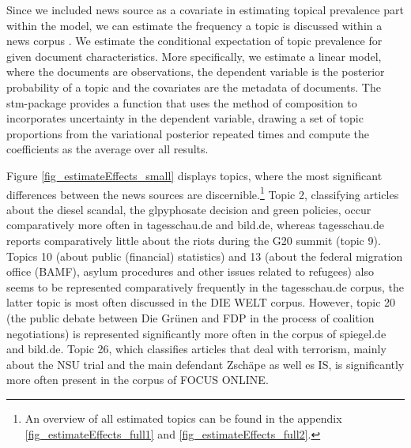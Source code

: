 \documentclass[12pt,a4paper,notitlepage]{article}
\begin{document}

Since we included news source as a covariate in estimating topical prevalence part within the model, we can estimate the frequency a topic is discussed within a news corpus \citep{roberts_model_2016}. We estimate the conditional expectation of topic prevalence for given document characteristics. More specifically, we estimate a linear model, where the documents are observations, the dependent variable is the posterior probability of a topic and the covariates are the metadata of documents. The stm-package provides a function that uses the method of composition to incorporates uncertainty in the dependent variable, drawing a set of topic proportions from the variational posterior repeated times and compute the coefficients as the average over all results. 

Figure \ref{fig_estimateEffects_small} displays topics, where the most significant differences between the news sources are discernible.\footnote{An overview of all estimated topics can be found in the appendix \ref{fig_estimateEffects_full1} and \ref{fig_estimateEffects_full2}.} Topic 2, classifying articles about the diesel scandal, the glpyphosate decision and green policies, occur comparatively more often in tagesschau.de and bild.de, whereas tagesschau.de reports comparatively little about the riots during the G20 summit (topic 9). Topics 10 (about public (financial) statistics) and 13 (about the federal migration office (BAMF), asylum procedures and other issues related to refugees) also seems to be represented comparatively frequently in the tagesschau.de corpus, the latter topic is most often discussed in the DIE WELT corpus. However, topic 20 (the public debate between Die Grünen and FDP in the process of coalition negotiations) is represented significantly more often in the corpus of spiegel.de and bild.de. Topic 26, which classifies articles that deal with terrorism, mainly about the NSU trial and the main defendant Zschäpe as well es IS, is significantly more often present in the corpus of FOCUS ONLINE.
\end{document}
